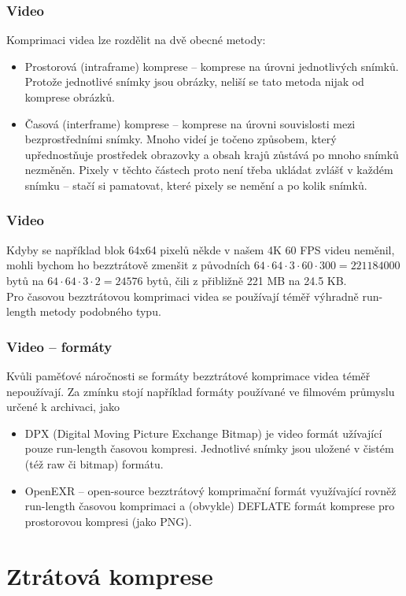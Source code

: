\documentclass[aspectratio=169,11pt,svgnames,handout]{beamer}
\begin{document}
\begin{frame}
 \frametitle{Video}
 Komprimaci videa lze rozdělit na dvě obecné metody:
 \begin{itemize}[label=\textbullet]
  \item \alert{Prostorová} (intraframe) komprese -- komprese na úrovni
   jednotlivých snímků. Protože jednotlivé snímky jsou obrázky, neliší se tato
   metoda nijak od komprese obrázků.
  \pause
 \item \alert{Časová} (interframe) komprese -- komprese na úrovni souvislosti
  mezi bezprostředními snímky. Mnoho videí je točeno způsobem, který
  upřednostňuje prostředek obrazovky a obsah krajů zůstává po mnoho snímků
  nezměněn. \pause
  Pixely v těchto částech proto není třeba ukládat zvlášť v každém snímku --
  stačí si pamatovat, které pixely se nemění a po kolik snímků.
 \end{itemize}
\end{frame}

\begin{frame}
 \frametitle{Video}
 Kdyby se například blok 64x64 pixelů někde v našem 4K 60 FPS videu neměnil,
 mohli bychom ho bezztrátově zmenšit z původních $64 \cdot 64 \cdot 3 \cdot 60
 \cdot 300 = 221184000$ bytů na $64 \cdot 64 \cdot 3 \cdot 2 = 24576$ bytů, čili
 z přibližně 221 MB na 24.5 KB.\pause\\
 Pro \alert{časovou} bezztrátovou komprimaci videa se používají téměř výhradně
 run-length metody podobného typu.
\end{frame}

\begin{frame}
 \frametitle{Video -- formáty}
 Kvůli paměťové náročnosti se formáty bezztrátové komprimace videa téměř
 nepoužívají. \pause Za zmínku stojí například formáty používané ve filmovém
 průmyslu určené k archivaci, jako
 \begin{itemize}[label=\textbullet]
  \item \alert{DPX} (Digital Moving Picture Exchange Bitmap) je video formát
   užívající pouze run-length časovou kompresi. Jednotlivé snímky jsou uložené v
   čistém (též raw či bitmap) formátu.
   \pause
  \item \alert{OpenEXR} -- open-source bezztrátový komprimační formát
   využívající rovněž run-length časovou komprimaci a (obvykle) DEFLATE formát
   komprese pro prostorovou kompresi (jako PNG).
 \end{itemize}
\end{frame}

\section{Ztrátová komprese}
\label{sec:ztratova-komprese}
\end{document}
